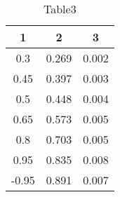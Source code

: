 \begin{table} 
 \caption{Table3}
\begin{tabular}{|*{3}{c|}}
\hline 
1 & 2 & 3\\ \hline 
0.3 & 0.269 & 0.002 \\ \hline 
 0.45 & 0.397 & 0.003 \\ \hline 
 0.5 & 0.448 & 0.004 \\ \hline 
 0.65 & 0.573 & 0.005 \\ \hline 
 0.8 & 0.703 & 0.005 \\ \hline 
 0.95 & 0.835 & 0.008 \\ \hline 
 -0.95 & 0.891 & 0.007 \\ \hline 
 \end{tabular} 
\end{table} 
